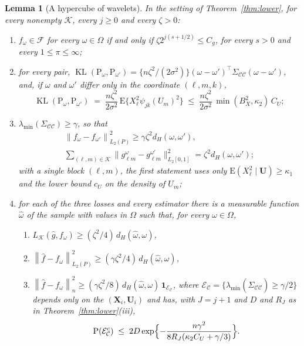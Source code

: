 \documentclass[10pt]{book}
\newtheorem{lemma}{Lemma}[section]
\theoremstyle{definition}
\newcommand{\E}{\mathrm{E}}
\newcommand{\Prob}{\mathrm{P}}
\newcommand{\T}{^{\top}}
\newcommand{\norm}[1]{\left\lVert #1 \right\rVert}
\newcommand{\normn}[1]{\left\lVert #1 \right\rVert_{n}}
\newcommand{\cv}{\ell}
\newcommand{\md}{m}
\newcommand{\lev}{j}
\newcommand{\tsl}{k}
\newcommand{\bX}{\mathbf{X}}
\newcommand{\bU}{\mathbf{U}}
\newcommand{\gcomp}[2]{g_{#1#2}}
\newcommand{\wav}[2]{\psi_{#1#2}}
\newcommand{\Gram}{\Sigma}
\newcommand{\Gramhat}{\widehat{\Sigma}}
\newcommand{\lmin}{\lambda_{\min}}
\newcommand{\Kcal}{\mathcal{K}}
\begin{document}
{\begin{lemma}[A hypercube of wavelets]
\label{lem:hypercube}
In the setting of Theorem~\ref{thm:lower}, for every nonempty $\Kcal$, every
$\lev \ge 0$ and every $\zeta > 0$:
\begin{enumerate}
\item[(i)] $f_{\omega} \in \mathcal{F}$ for every $\omega \in \Omega$ if and
only if $\zeta2^{\lev(s+1/2)} \le C_g$, for every $s > 0$ and every
$1 \le \pi \le \infty$;
\item[(ii)] for every pair,
$\operatorname{KL}(\Prob_{\omega},\Prob_{\omega'}) =
\{n\zeta^{2}/(2\sigma^{2})\}(\omega-\omega')\T\Gram_{\mathcal{C}\mathcal{C}}(\omega-\omega')$,
and, if $\omega$ and $\omega'$ differ only in the coordinate $(\cv,\md,\tsl)$,
\[
  \operatorname{KL}(\Prob_{\omega},\Prob_{\omega'})
  \;=\; \frac{n\zeta^{2}}{2\sigma^{2}}\,\E\bigl\{X_{\cv}^{2}\wav{\lev}{\tsl}(U_{\md})^{2}\bigr\}
  \;\le\; \frac{n\zeta^{2}}{2\sigma^{2}}\,\min(B_X^{2},\kappa_2)\,C_U ;
\]
\item[(iii)] $\lmin(\Gram_{\mathcal{C}\mathcal{C}}) \ge \gamma$, so that
\begin{gather*}
  \norm{f_{\omega}-f_{\omega'}}_{L_2(P)}^{2} \ge \gamma\zeta^{2}d_{H}(\omega,\omega'),
  \\
  \sum_{(\cv,\md)\in\Kcal}\lVert\gcomp{\cv}{\md}^{\omega} -
  \gcomp{\cv}{\md}^{\omega'}\rVert_{L_2[0,1]}^{2} = \zeta^{2}d_{H}(\omega,\omega') ;
\end{gather*}
with a single block $(\cv,\md)$, the first statement uses only
$\E(X_{\cv}^{2}\mid\bU) \ge \kappa_1$ and the lower bound $c_U$ on the
density of $U_{\md}$;
\item[(iv)] for each of the three losses and every estimator there is a
measurable function $\widehat\omega$ of the sample with values in $\Omega$
such that, for every $\omega \in \Omega$,
\begin{enumerate}
\item[(a)] $L_{\Kcal}(\widehat{g},f_{\omega}) \ge (\zeta^{2}/4)\,d_{H}(\widehat\omega,\omega)$,
\item[(b)] $\norm{\widehat{f}-f_{\omega}}_{L_2(P)}^{2} \ge (\gamma\zeta^{2}/4)\,d_{H}(\widehat\omega,\omega)$,
\item[(c)] $\normn{\widehat{f}-f_{\omega}}^{2} \ge (\gamma\zeta^{2}/8)\,
d_{H}(\widehat\omega,\omega)\,\mathbf{1}_{\mathcal{E}_{\mathcal{C}}}$, where
$\mathcal{E}_{\mathcal{C}} = \{\lmin(\Gramhat_{\mathcal{C}\mathcal{C}}) \ge \gamma/2\}$
depends only on the $(\bX_i,\bU_i)$ and has, with $J = \lev+1$ and $D$ and
$R_J$ as in Theorem~\ref{thm:lower}(iii),
\[
  \Prob(\mathcal{E}_{\mathcal{C}}^{c}) \;\le\;
  2D\exp\Bigl\{-\frac{n\gamma^{2}}{8R_{J}(\kappa_2C_U + \gamma/3)}\Bigr\} .
\]
\end{enumerate}
\end{enumerate}
\end{lemma}

}
\end{document}
